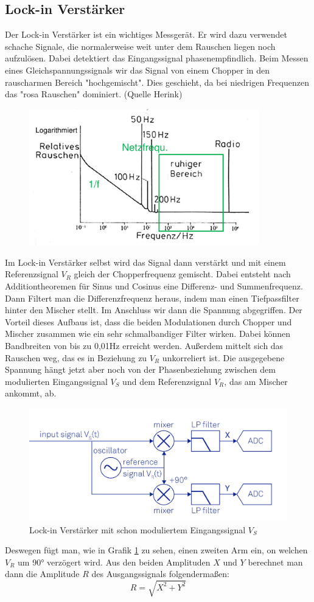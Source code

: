 
\subsection{Lock-in Verstärker}

Der Lock-in Verstärker ist ein wichtiges Messgerät. Er wird dazu verwendet schache Signale, die normalerweise weit unter dem Rauschen liegen noch aufzulösen.
Dabei detektiert das Eingangssignal phasenempfindlich. Beim Messen eines Gleichspannungssignals wir das Signal von einem Chopper in den rauscharmen Bereich "hochgemischt". 
Dies geschieht, da bei niedrigen Frequenzen das "rosa Rauschen" dominiert. (Quelle Herink) 

\begin{figure}[h]
    \centering
    \includegraphics[width = 10cm ]{Bilder/Rauschen.png}
\end{figure}
Im Lock-in Verstärker selbst wird das Signal dann verstärkt und mit einem Referenzsignal $V_R$ gleich der Chopperfrequenz gemischt. Dabei entsteht nach Additiontheoremen für Sinus und Cosinus eine
Differenz- und Summenfrequenz. Dann Filtert man die Differenzfrequenz heraus, indem man einen Tiefpassfilter hinter den Mischer stellt. Im Anschluss wir dann die Spannung abgegriffen. 
Der Vorteil dieses Aufbaus ist, dass die beiden Modulationen durch Chopper und Mischer zusammen wie ein sehr schmalbandiger Filter wirken. Dabei können Bandbreiten von bis zu 0,01Hz erreicht werden. 
Außerdem mittelt sich das Rauschen weg, das es in Beziehung zu $V_R$ unkorreliert ist. Die ausgegebene Spannung hängt jetzt aber noch von der Phasenbeziehung zwischen dem 
modulierten Eingangssignal $V_S$ und dem Referenzsignal $V_R$, das am Mischer ankommt, ab.
\begin{figure}[ht]
    \centering
    \includegraphics[width = 12cm]{Bilder/Lockin.png}
    \caption{Lock-in Verstärker mit schon moduliertem Eingangssignal $V_S$}
    \label{lockin}
\end{figure}
 Deswegen fügt man, wie in Grafik \ref{lockin} zu sehen, einen zweiten Arm ein, on welchen $V_R$ 
um 90° verzögert wird. Aus den beiden Amplituden $X$ und $Y$ berechnet man dann die Amplitude $R$ des Ausgangssignals folgendermaßen:
\begin{equation*}
    R = \sqrt{X^{2}+Y^{2}}
\end{equation*}
  

